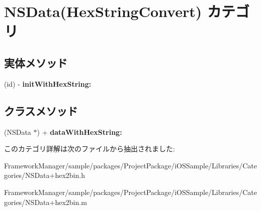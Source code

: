 \hypertarget{category_n_s_data_07_hex_string_convert_08}{}\section{N\+S\+Data(Hex\+String\+Convert) カテゴリ}
\label{category_n_s_data_07_hex_string_convert_08}
\subsection*{実体メソッド}
\begin{DoxyCompactItemize}
\item 
\hypertarget{category_n_s_data_07_hex_string_convert_08_a15ace2e60295b83a8570861ab994bc74}{}(id) -\/ {\bfseries init\+With\+Hex\+String\+:}\label{category_n_s_data_07_hex_string_convert_08_a15ace2e60295b83a8570861ab994bc74}

\end{DoxyCompactItemize}
\subsection*{クラスメソッド}
\begin{DoxyCompactItemize}
\item 
\hypertarget{category_n_s_data_07_hex_string_convert_08_a7fdaf6bd825a37d8484d28e618f6eee5}{}(N\+S\+Data $\ast$) + {\bfseries data\+With\+Hex\+String\+:}\label{category_n_s_data_07_hex_string_convert_08_a7fdaf6bd825a37d8484d28e618f6eee5}

\end{DoxyCompactItemize}


このカテゴリ詳解は次のファイルから抽出されました\+:\begin{DoxyCompactItemize}
\item 
Framework\+Manager/sample/packages/\+Project\+Package/i\+O\+S\+Sample/\+Libraries/\+Categories/N\+S\+Data+hex2bin.\+h\item 
Framework\+Manager/sample/packages/\+Project\+Package/i\+O\+S\+Sample/\+Libraries/\+Categories/N\+S\+Data+hex2bin.\+m\end{DoxyCompactItemize}
